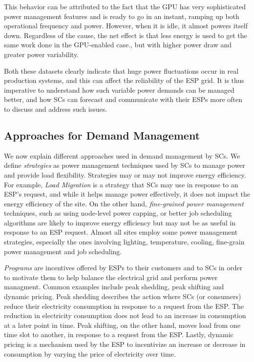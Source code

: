 This behavior can be attributed to the fact that the GPU has very sophisticated power management features and is ready to go in an instant, ramping up both operational frequency and power. However, when it is idle, it almost powers itself down.  Regardless of the cause, the net effect is that less energy is used to get the same work done in the GPU-enabled case., but with higher power draw and greater power variability.

Both these datasets clearly indicate that huge power fluctuations occur in real production systems, and this can affect the reliability of the ESP grid. It is thus imperative to understand how such variable power demands can be managed better, and how SCs can forecast and communicate with their ESPs more often to discuss and address such issues. 

\subsection{Approaches for Demand Management}
We now explain different approaches used in demand management by SCs. We define \emph{strategies} as power management techniques used by SCs to manage power and provide load flexibility. Strategies may or may not improve energy efficiency. For example, \emph{Load Migration} is a strategy that SCs may use in response to an ESP's request, and while it helps manage power effectively, it does not impact the energy efficiency of the site. On the other hand, \emph{fine-grained power management} techniques, such as using node-level power capping, or better job scheduling algorithms are likely to improve energy efficiency but may not be as useful in response to an ESP request. Almost all sites employ some power management strategies, especially the ones involving lighting, temperature, cooling, fine-grain power management and job scheduling. 

\emph{Programs} are incentives offered by ESPs to their customers and to SCs in order to motivate them to help balance the electrical grid and perform power managment. Common examples include peak shedding, peak shifting and dynamic pricing. Peak shedding describes the action where SCs (or consumers) reduce their electricity consumption in response to a request from the ESP. The reduction in electricity consumption does not lead to an increase in consumption at a later point in time. Peak shifting, on the other hand, moves load from one time slot to another, in response to a request from the ESP. Lastly, dynamic pricing is a mechanism used by the ESP to incentivize an increase or decrease in consumption by varying the price of electricity over time.

